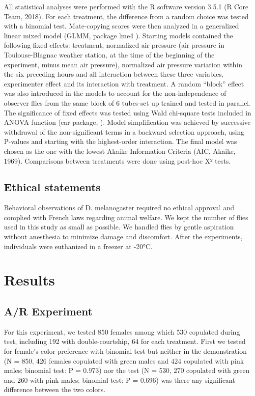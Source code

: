 \documentclass[a4paper, 12pt]{article}
\begin{document}
	All statistical analyses were performed with the R software version 3.5.1 (R Core Team, 2018).
	For each treatment, the difference from a random choice was tested with a binomial test. Mate-copying scores were then analyzed in a generalized linear mixed model (GLMM, package lme4 \parencite{bates_fitting_2015}). Starting models contained the following fixed effects: treatment, normalized air pressure (air pressure in Toulouse-Blagnac weather station, at the time of the beginning of the experiment, minus mean air pressure), normalized air pressure variation within the six preceding hours and all interaction between these three variables, experimenter effect and its interaction with treatment. A random “block” effect was also introduced in the models to account for the non-independence of observer flies from the same block of 6 tubes-set up trained and tested in parallel. The significance of fixed effects was tested using Wald chi-square tests included in ANOVA function (car package, \textcite{fox_r_2018} ). Model simplification was achieved by successive withdrawal of the non-significant terms in a backward selection approach, using P-values and starting with the highest-order interaction. The final model was chosen as the one with the lowest Akaike Information Criteria (AIC, Akaike, 1969). Comparisons between treatments were done using post-hoc X² tests. 

	\subsection{Ethical statements}

	Behavioral observations of D. melanogaster required no ethical approval and complied with French laws regarding animal welfare. We kept the number of flies used in this study as small as possible. We handled flies by gentle aspiration without anesthesia to minimize damage and discomfort. After the experiments, individuals were euthanized in a freezer at -20°C.

	\section{Results}

	\subsection{A/R Experiment}
	\label{subsec:AR-experiment}

	For this experiment, we tested 850 females among which 530 copulated during test, including 192 with double-courtship, 64 for each treatment. First we tested for female's color preference with binomial test but neither in the demonstration (N = 850, 426 females copulated with green males and 424 copulated with pink males; binomial test: P = 0.973) nor the test (N = 530, 270 copulated with green and 260 with pink males; binomial test: P = 0.696) was there any significant difference between the two colors.
\end{document}
